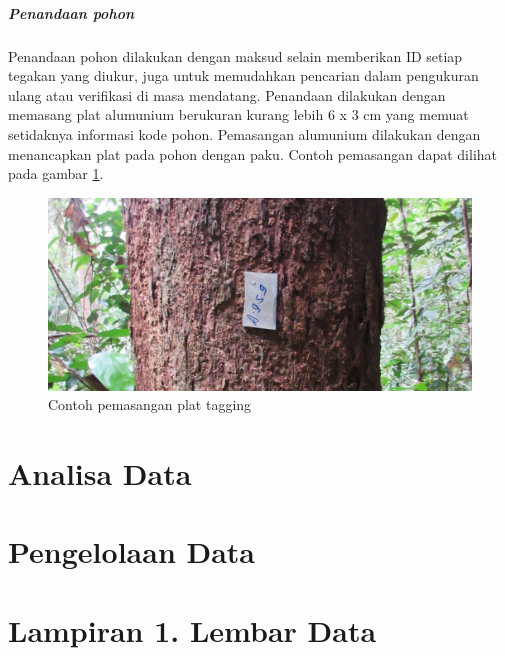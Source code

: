 \documentclass[
  oneside]{book}
\begin{document}
\hypertarget{penandaan-pohon}{%
\paragraph*{Penandaan pohon}\label{penandaan-pohon}}

Penandaan pohon dilakukan dengan maksud selain memberikan ID setiap tegakan yang diukur, juga untuk memudahkan pencarian dalam pengukuran ulang atau verifikasi di masa mendatang. Penandaan dilakukan dengan memasang plat alumunium berukuran kurang lebih 6 x 3 cm yang memuat setidaknya informasi kode pohon. Pemasangan alumunium dilakukan dengan menancapkan plat pada pohon dengan paku. Contoh pemasangan dapat dilihat pada gambar \ref{fig:figtag}.

\begin{figure}

{\centering \includegraphics[width=1\linewidth]{images/tagging} 

}

\caption{Contoh pemasangan plat tagging}\label{fig:figtag}
\end{figure}

\hypertarget{analisa-data}{%
\chapter*{Analisa Data}\label{analisa-data}}

\hypertarget{pengelolaan-data}{%
\chapter*{Pengelolaan Data}\label{pengelolaan-data}}

\hypertarget{lampiran-1.-lembar-data}{%
\chapter*{Lampiran 1. Lembar Data}\label{lampiran-1.-lembar-data}}
\end{document}
